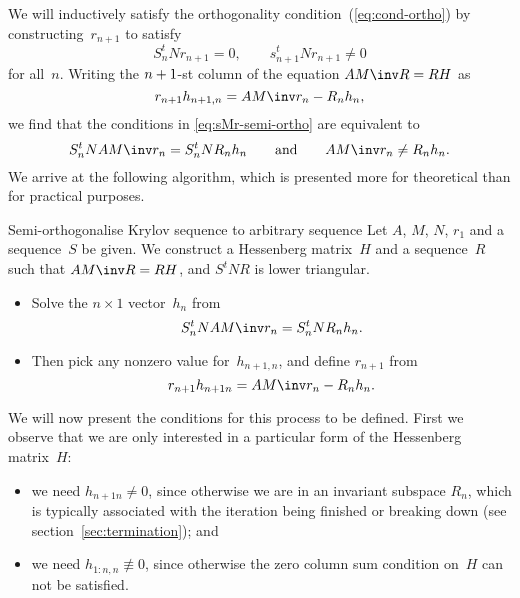 \documentclass[11pt]{artikel3}
\begin{document}
\begin{Outline}
We will inductively satisfy the orthogonality condition~(\ref{eq:cond-ortho})
by constructing~$r_{n+1}$ to satisfy
\begin{equation} S_n^tN r_{n+1}=0, \qquad s_{n+1}^tN r_{n+1}\not=0
    \label{eq:sMr-semi-ortho}\end{equation}
for all~$n$.
Writing the $n+\nobreak1$-st column of the equation $AM\inv R=RH$ as
    \begin{equation} r_{n+1}h_{n+1,n}=AM\inv r_n-R_nh_n,
    \label{eq:h-gen-ortho}\end{equation}
we find that the conditions in \eqref{eq:sMr-semi-ortho}
are equivalent to 
    \begin{equation} S_n^tN AM\inv r_n=S_n^tN R_nh_n
        \qquad\hbox{and}\qquad
                AM\inv r_n\not=R_nh_n.
    \label{eq:h-solve-ortho}\end{equation}
We arrive at the following algorithm, which is presented more for
theoretical than for practical purposes.

\begin{algorithm}{Semi-orthogonalise Krylov sequence to arbitrary sequence}
\label{SR:algorithm}
Let $A$, $M$, $N$, $r_1$ and a sequence~$S$ be given.
We construct a Hessenberg matrix~$H$
and a sequence~$R$ such that $AM\inv R=RH$,
and $S^tN R$ is lower triangular.
\begin{itemize}
\item Solve the $n\times1$ vector~$h_n$ from
\[ S_n^tN AM\inv r_n=S_n^tN R_nh_n. \]
\item Then pick any nonzero value for~$h_{n+1,n}$, and define $r_{n+1}$ from
\[ r_{n+1}h_{n+1n}=AM\inv r_n-R_nh_n. \]
\end{itemize}
\end{algorithm}

We will now present the conditions for this process to be defined.
First we observe that we are only interested in a particular form
of the Hessenberg matrix~$H$:
\begin{itemize}
\item we need $h_{n+1n}\not=0$, since otherwise we are in
an invariant subspace $R_n$, which is typically associated with the
iteration
being finished or breaking down
(see section~\ref{sec:termination}); and
\item we need $h_{1:n,n}\not\equiv0$, since otherwise
the zero column sum condition on~$H$ can not be satisfied.
\end{itemize}


\end{Outline}
\end{document}
